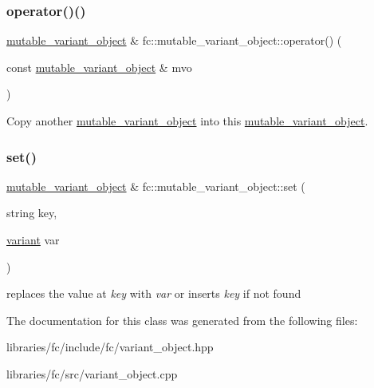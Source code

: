 \subsubsection{\texorpdfstring{operator()()}{operator()()}\hspace{0.1cm}{\footnotesize\ttfamily [3/3]}}
{\footnotesize\ttfamily \mbox{\hyperlink{classfc_1_1mutable__variant__object}{mutable\+\_\+variant\+\_\+object}} \& fc\+::mutable\+\_\+variant\+\_\+object\+::operator() (\begin{DoxyParamCaption}\item[{const \mbox{\hyperlink{classfc_1_1mutable__variant__object}{mutable\+\_\+variant\+\_\+object}} \&}]{mvo }\end{DoxyParamCaption})}

Copy another \mbox{\hyperlink{classfc_1_1mutable__variant__object}{mutable\+\_\+variant\+\_\+object}} into this \mbox{\hyperlink{classfc_1_1mutable__variant__object}{mutable\+\_\+variant\+\_\+object}}. \mbox{\label{classfc_1_1mutable__variant__object_af9dc6ef0475bae644c8904eb4607b6e0}} 
\subsubsection{\texorpdfstring{set()}{set()}}
{\footnotesize\ttfamily \mbox{\hyperlink{classfc_1_1mutable__variant__object}{mutable\+\_\+variant\+\_\+object}} \& fc\+::mutable\+\_\+variant\+\_\+object\+::set (\begin{DoxyParamCaption}\item[{string}]{key,  }\item[{\mbox{\hyperlink{classfc_1_1variant}{variant}}}]{var }\end{DoxyParamCaption})}

replaces the value at {\itshape key} with {\itshape var} or insert\textquotesingle{}s {\itshape key} if not found 

The documentation for this class was generated from the following files\+:\begin{DoxyCompactItemize}
\item 
libraries/fc/include/fc/variant\+\_\+object.\+hpp\item 
libraries/fc/src/variant\+\_\+object.\+cpp\end{DoxyCompactItemize}
